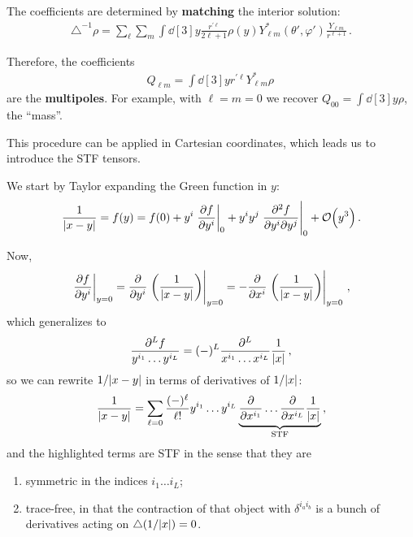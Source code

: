 \documentclass[main.tex]{subfiles}
\begin{document}
The coefficients are determined by \textbf{matching} the interior solution: 
%
\begin{align}
\triangle^{-1} \rho = \sum _{\ell} \sum _{m}
\int \dd[3]{y} \frac{r^{\prime \ell}}{2 \ell + 1}
\rho (y) Y^{*}_{\ell m} (\theta ', \varphi ') \frac{Y_{\ell m}}{r^{\ell + 1}}
\,.
\end{align}

Therefore, the coefficients 
%
\begin{align}
Q_{
    \ell m
}
= \int \dd[3]{y}
r^{\prime \ell} Y^{*}_{\ell m} \rho 
\,
\end{align}
%
are the \textbf{multipoles}. 
For example, with \(\ell = m = 0\) we recover \(Q_{00} = \int \dd[3]{y} \rho \), the ``mass''.  

This procedure can be applied in Cartesian coordinates, which leads us to introduce the STF tensors. 

We start by Taylor expanding the Green function in \(y\): 
%
\begin{align}
\frac{1}{\abs{x-y}} = f(y) = f(0) 
+ y^{i} \eval{\pdv{f}{y^{i}}}_{0}
+ y^{i}y^{j} \eval{\pdv{f}{y^{i}}{y^{j}}}_{0} + \order{y^3}
\,.
\end{align}

Now, 
%
\begin{align}
\eval{\pdv{f}{y^{i}}}_{y=0} = \pdv{y^{i}} \eval{\qty( \frac{1}{\abs{x-y}})}_{y=0} 
= - \pdv{x^{i}} \eval{\qty( \frac{1}{\abs{x-y}})}_{y=0} 
\,,
\end{align}
%
which generalizes to 
%
\begin{align}
\frac{\partial^{L} f}{y^{i_1} \dots y^{i_L}} = (-)^{L} \frac{\partial^{L}}{x^{i_1}\dots x^{i_L}} \frac{1}{\abs{x}}
\,,
\end{align}
%
so we can rewrite \(1/ \abs{x-y}\) in terms of derivatives of \(1/ \abs{x}\): 
%
\begin{align}
\frac{1}{\abs{x-y}} = \sum _{\ell=0}
\frac{(-)^{\ell}}{\ell!} y^{i_1} \dots y^{i_L} \underbrace{\pdv{x^{i_1}} \dots
\pdv{x^{i_L}} \frac{1}{\abs{x}}}_{\text{STF}}
\,,
\end{align}
%
and the highlighted terms are STF in the sense that they are 
\begin{enumerate}
    \item symmetric in the indices \(i_1 \dots i_L\);
    \item trace-free, in that the contraction of that object with \(\delta^{i_a i_b}\) is a bunch of derivatives acting on \(\triangle (1/\abs{x}) = 0\).  
\end{enumerate}
\end{document}
